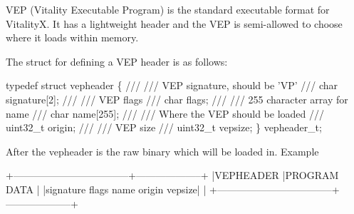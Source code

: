 V\+EP (Vitality Executable Program) is the standard executable format for VitalityX. It has a lightweight header and the V\+EP is semi-\/allowed to choose where it loads within memory.

The struct for defining a V\+EP header is as follows\+:


\begin{DoxyCode}
typedef struct vepheader \{
    ///
    /// VEP signature, should be 'VP'
    ///
    char signature[2];
    ///
    /// VEP flags
    /// 
    char flags;
    ///
    /// 255 character array for name
    ///
    char name[255];
    ///
    /// Where the VEP should be loaded
    ///
    uint32\_t origin;
    ///
    /// VEP size
    ///
    uint32\_t vepsize;
\} vepheader\_t;
\end{DoxyCode}


After the vepheader is the raw binary which will be loaded in. Example


\begin{DoxyCode}
+-----------------------------------+--------------------+
|VEPHEADER                          |PROGRAM DATA        |
|signature flags name origin vepsize|                    |
+-----------------------------------+--------------------+
\end{DoxyCode}
 